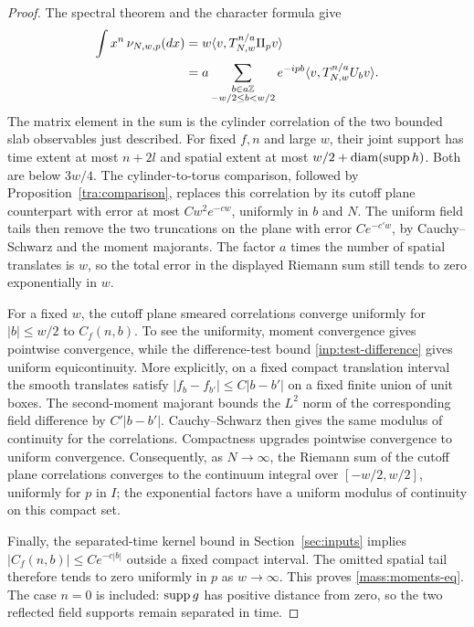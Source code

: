 \begin{proof}
The spectral theorem and the character formula give
\begin{align*}
 \int x^n\,\nu_{N,w,p}(dx)
 &=w\langle v,T_{N,w}^{n/a}\Pi_pv\rangle\\
 &=a\sum_{\substack{b\in a\mathbb Z\\-w/2\le b<w/2}}
       e^{-ipb}\langle v,T_{N,w}^{n/a}U_bv\rangle.
\end{align*}
The matrix element in the sum is the cylinder correlation of the two
bounded slab observables just described. For fixed $f,n$ and large $w$,
their joint support has time extent at most $n+2l$ and spatial extent at
most $w/2+\operatorname{diam}(\operatorname{supp} h)$. Both are below $3w/4$.
The cylinder-to-torus comparison, followed by
Proposition~\ref{tra:comparison}, replaces this correlation by its cutoff
plane counterpart with error at most $Cw^2e^{-cw}$, uniformly in $b$ and
$N$. The uniform field tails then remove the two truncations on the
plane with error $Ce^{-c'w}$, by Cauchy--Schwarz and the moment majorants.
The factor $a$ times the number of spatial translates is $w$, so the
total error in the displayed Riemann sum still tends to zero exponentially
in $w$.

For a fixed $w$, the cutoff plane smeared correlations converge uniformly
for $|b|\le w/2$ to $C_f(n,b)$. To see the uniformity, moment convergence
gives pointwise convergence, while the difference-test bound
\eqref{inp:test-difference} gives uniform equicontinuity. More explicitly,
on a fixed compact translation interval the smooth translates satisfy
$|f_b-f_{b'}|\le C|b-b'|$ on a fixed finite union of unit boxes. The
second-moment majorant bounds the $L^2$ norm of the corresponding field
difference by $C'|b-b'|$. Cauchy--Schwarz then gives the same modulus of
continuity for the correlations. Compactness upgrades pointwise
convergence to uniform convergence. Consequently, as $N\to\infty$, the
Riemann sum of the cutoff plane correlations converges to the continuum
integral over $[-w/2,w/2]$, uniformly for $p$ in $I$; the exponential
factors have a uniform modulus of continuity on this compact set.

Finally, the separated-time kernel bound in Section~\ref{sec:inputs}
implies $|C_f(n,b)|\le Ce^{-c|b|}$ outside a fixed compact interval.
The omitted spatial tail therefore tends to zero uniformly in $p$ as
$w\to\infty$. This proves \eqref{mass:moments-eq}. The case $n=0$ is
included: $\operatorname{supp} g$ has positive distance from zero, so the two reflected
field supports remain separated in time.
\end{proof}

